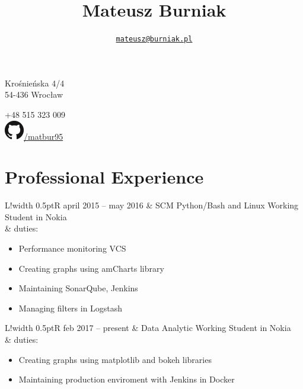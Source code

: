 \documentclass{article}
\title{\bf\Huge Mateusz Burniak}
\author{\href{mailto:mateusz@burniak.pl}{\nolinkurl{mateusz@burniak.pl}}}
\date{}
\newcommand\VRule{\color{lightgray}\vrule width 0.5pt}
\begin{document}
\maketitle
\thispagestyle{fancy}

\begin{minipage}[ht]{.5\textwidth}
\centering
Krośnieńska 4/4 \\
54-436 Wrocław
\end{minipage}
\begin{minipage}[ht]{.5\textwidth}
\centering
+48 515 323 009\\
\href{https://github.com/matbur95}{\includegraphics[scale=.3]{github.png}/matbur95}\\
\end{minipage}

\vspace{1em}

\section*{Professional Experience}
\begin{tabular}{L!{\VRule}R}
april 2015 -- may 2016 & SCM Python/Bash and Linux Working Student in Nokia \\
& duties:
\begin{itemize}
\item Performance monitoring VCS
\item Creating graphs using amCharts library
\item Maintaining SonarQube, Jenkins
\item Managing filters in Logstash
\end{itemize}
\end{tabular}

\noindent
\begin{tabular}{L!{\VRule}R}
feb 2017 -- present & Data Analytic Working Student in Nokia \\
& duties:
\begin{itemize}
\item Creating graphs using matplotlib and bokeh libraries
\item Maintaining production enviroment with Jenkins in Docker
\end{itemize}

\end{tabular}
\end{document}
